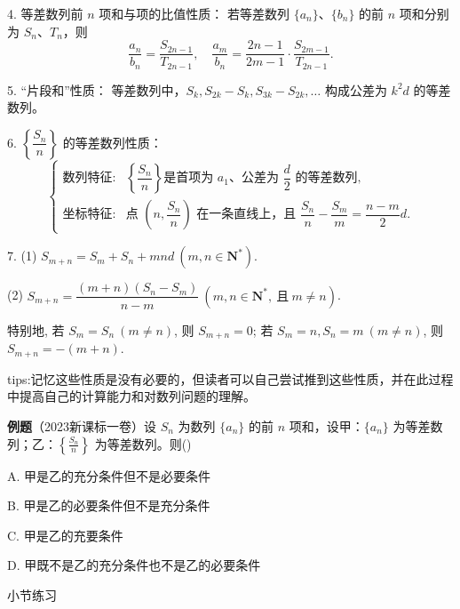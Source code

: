 \documentclass{article}
\begin{document}
4. 等差数列前 \(n\) 项和与项的比值性质：
若等差数列 \(\{a_n\}\)、\(\{b_n\}\) 的前 \(n\) 项和分别为 \(S_n\)、\(T_n\)，则
\[
\frac{a_n}{b_n} = \frac{S_{2n-1}}{T_{2n-1}},\quad \frac{a_m}{b_n} = \frac{2n-1}{2m-1}\cdot\frac{S_{2m-1}}{T_{2n-1}}.
\]

5. “片段和”性质：
等差数列中，\(S_k, S_{2k}-S_k, S_{3k}-S_{2k},\dots\) 构成公差为 \(k^2d\) 的等差数列。

6. \(\left\{\dfrac{S_n}{n}\right\}\) 的等差数列性质：
\[
\begin{cases}
\text{数列特征}: & \left\{\dfrac{S_n}{n}\right\}\text{是首项为 }a_1\text{、公差为 }\dfrac{d}{2}\text{ 的等差数列}, \\
\text{坐标特征}: & \text{点 }\left(n,\dfrac{S_n}{n}\right)\text{ 在一条直线上，且 }\dfrac{S_n}{n} - \dfrac{S_m}{m} = \dfrac{n-m}{2}d.
\end{cases}
\]

7. (1) \(S_{m+n} = S_m + S_n + mnd\ (m,n \in \mathbf{N}^*)\).

(2) \(S_{m+n} = \dfrac{(m+n)(S_n - S_m)}{n - m}\ (m,n \in \mathbf{N}^*,\ \text{且}\ m \neq n)\).

特别地, 若 \(S_m = S_n\ (m \neq n)\), 则 \(S_{m+n} = 0\); 若 \(S_m = n, S_n = m\ (m \neq n)\), 则 \(S_{m+n} = -(m + n)\).
\vspace{2\baselineskip}

\begin{tcolorbox}[colback=blue!10,colframe=blue!70!black,title=]
    tips:记忆这些性质是没有必要的，但读者可以自己尝试推到这些性质，并在此过程中提高自己的计算能力和对数列问题的理解。
\end{tcolorbox}
\vspace{2\baselineskip}

\noindent\textbf{例题}（2023新课标一卷）设 \(S_n\) 为数列 \(\{a_n\}\) 的前 \(n\) 项和，设甲：\(\{a_n\}\) 为等差数列；乙：\(\left\{\frac{S_n}{n}\right\}\) 为等差数列。则(\;\;\;)

\vspace{0.5em}
A. 甲是乙的充分条件但不是必要条件 

B. 甲是乙的必要条件但不是充分条件 

C. 甲是乙的充要条件 

D. 甲既不是乙的充分条件也不是乙的必要条件



\newpage

\begin{center}
    小节练习
\end{center}
\end{document}
